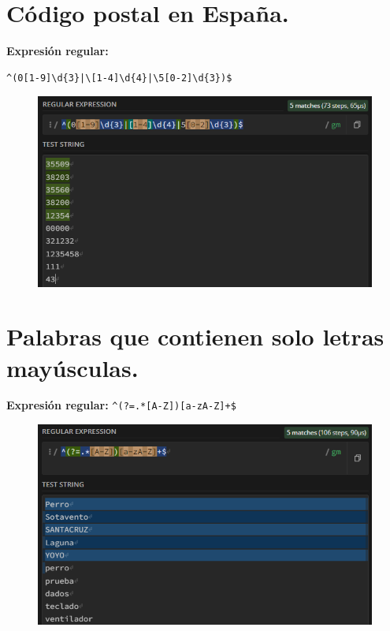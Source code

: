 \documentclass[11pt]{report}
\begin{document}
\section{Código postal en España.}
\textbf{Expresión regular:}
\begin{verbatim}
^(0[1-9]\d{3}|\[1-4]\d{4}|\5[0-2]\d{3})$
\end{verbatim}
\begin{figure}[H]
  \centering
  \includegraphics[scale=0.75]{img/op_extendidos_05.png}
\end{figure}

\section{Palabras que contienen solo letras mayúsculas.}
\textbf{Expresión regular:} \verb|^(?=.*[A-Z])[a-zA-Z]+$|
  \begin{figure}[H]
    \centering
    \includegraphics[scale=0.75]{img/op_extendidos_06.png} 
  \end{figure}

\newpage
\end{document}
